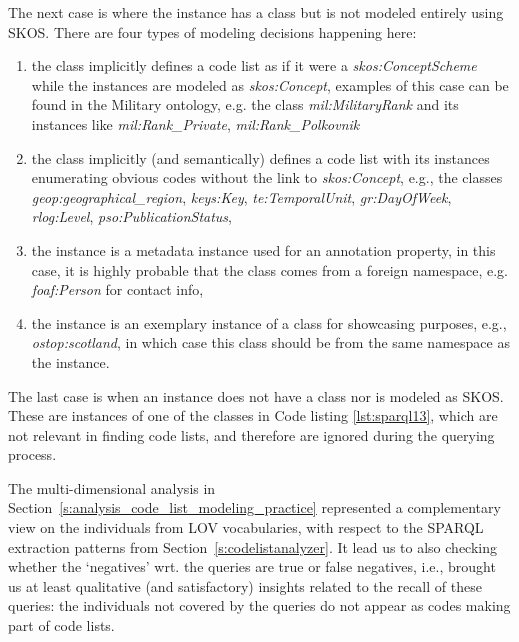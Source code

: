 The next case is where the instance has a class but is not modeled entirely using SKOS. There are four types of modeling decisions happening here:
\begin{enumerate}
    \item the class implicitly defines a code list as if it were a \textit{skos:ConceptScheme} while the instances are modeled as \textit{skos:Concept}, examples of this case can be found in the Military ontology, e.g. the class \textit{mil:MilitaryRank} and its instances like \textit{mil:Rank\_Private}, \textit{mil:Rank\_Polkovnik}
    \item the class implicitly (and semantically) defines a code list with its instances enumerating obvious codes without the link to \textit{skos:Concept}, e.g., the classes \textit{geop:geographical\_region}, \textit{keys:Key}, \textit{te:TemporalUnit}, \textit{gr:DayOfWeek}, \textit{rlog:Level}, \textit{pso:PublicationStatus},
    \item the instance is a metadata instance used for an annotation property, in this case, it is highly probable that the class comes from a foreign namespace, e.g. \textit{foaf:Person} for contact info,
    \item the instance is an exemplary instance of a class for showcasing purposes, e.g., \textit{ostop:scotland}, in which case this class should be from the same namespace as the instance.
\end{enumerate}

The last case is when an instance does not have a class nor is modeled as SKOS. These are instances of one of the classes in Code listing \ref{lst:sparql13}, which are not relevant in finding code lists, and therefore are ignored during the querying process.

The multi-dimensional analysis in Section~\ref{s:analysis_code_list_modeling_practice} represented a complementary view on the individuals from LOV vocabularies, with respect to the SPARQL extraction patterns from Section~\ref{s:codelistanalyzer}.
It lead us to also checking whether the `negatives' wrt. the queries are true or false negatives, i.e., brought us at least qualitative (and satisfactory) insights related to the recall of these queries: the individuals not covered by the queries do not appear as codes making part of code lists.


